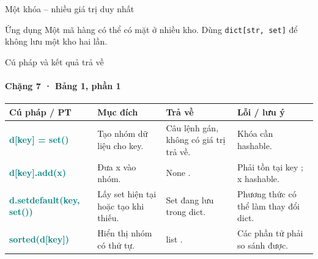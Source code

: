 \documentclass[aspectratio=169,10pt]{beamer}
\newcommand{\py}[1]{{\color{deepnavy}\texttt{#1}}}
\begin{document}
\begin{frame}[t]{Một khóa -- nhiều giá trị duy nhất}

\centering
{}
\vspace{5mm}
\begin{block}{Ứng dụng}
Một mã hàng có thể có mặt ở nhiều kho. Dùng \py{dict[str, set]} để không lưu một kho hai lần.
\end{block}

\end{frame}

\begin{frame}[t]{Cú pháp và kết quả trả về}
\framesubtitle{Chặng 7 · Bảng 1, phần 1}
\begingroup\scriptsize
\renewcommand{\arraystretch}{1.35}
\begin{tabularx}{\linewidth}{>{\raggedright\arraybackslash}p{2.42cm} >{\raggedright\arraybackslash}X >{\raggedright\arraybackslash}p{2.3cm} >{\raggedright\arraybackslash}p{3.15cm}}
\toprule
\textbf{Cú pháp / PT} & \textbf{Mục đích} & \textbf{Trả về} & \textbf{Lỗi / lưu ý} \\
\midrule
\textcolor{teal}{\bfseries d[key] = set()} & Tạo nhóm dữ liệu cho key. & Câu lệnh gán, không có giá trị trả về. & Khóa cần hashable. \\
\midrule
\textcolor{teal}{\bfseries d[key].add(x)} & Đưa x vào nhóm. & None . & Phải tồn tại key ; x hashable. \\
\midrule
\textcolor{teal}{\bfseries d.setdefault(key, set())} & Lấy set hiện tại hoặc tạo khi thiếu. & Set đang lưu trong dict. & Phương thức có thể làm thay đổi dict. \\
\midrule
\textcolor{teal}{\bfseries sorted(d[key])} & Hiển thị nhóm có thứ tự. & list . & Các phần tử phải so sánh được. \\
\midrule
\bottomrule
\end{tabularx}
\endgroup

\end{frame}
\end{document}
